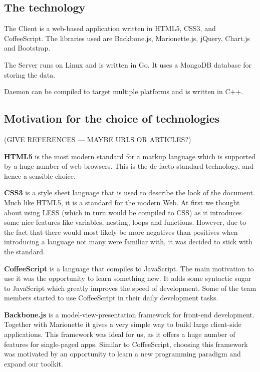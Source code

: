 \documentclass{l3proj}
\begin{document}
\subsection{The technology}

The Client is a web-based application written in HTML5, CSS3, and CoffeeScript. The libraries used are Backbone.js, Marionette.js, jQuery, Chart.js and Bootstrap.

The Server runs on Linux and is written in Go. It uses a MongoDB database for storing the data.

Daemon can be compiled to target multiple platforms and is written in C++.

\subsection{Motivation for the choice of technologies}

(GIVE REFERENCES --- MAYBE URLS OR ARTICLES?)

\textbf{HTML5} is the most modern standard for a markup language which is supported by a huge number of web browsers. This is the de facto standard technology, and hence a sensible choice.

\textbf{CSS3} is a style sheet language that is used to describe the look of the document. Much like HTML5, it is a standard for the modern Web. At first we thought about using LESS (which in turn would be compiled to CSS) as it introduces some nice features like variables, nesting, loops and functions. However, due to the fact that there would most likely be more negatives than positives when introducing a language not many were familiar with, it was decided to stick with the standard.

\textbf{CoffeeScript} is a language that compiles to JavaScript. The main motivation to use it was the opportunity to learn something new. It adds some syntactic sugar to JavaScript which greatly improves the speed of development. Some of the team members started to use CoffeeScript in their daily development tasks.

\textbf{Backbone.js} is a model-view-presentation framework for front-end development. Together with Marionette it gives a very simple way to build large client-side applications. This framework was ideal for us, as it offers a huge number of features for single-paged apps. Similar to CoffeeScript, choosing this framework was motivated by an opportunity to learn a new programming paradigm and expand our toolkit.
\end{document}
